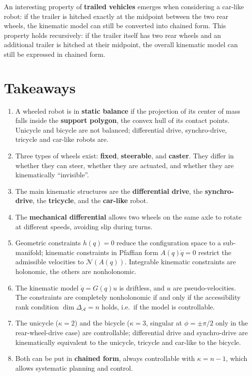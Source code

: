 \begin{nb}
An interesting property of \textbf{trailed vehicles} emerges when
considering a car-like robot: if the trailer is hitched exactly at the
midpoint between the two rear wheels, the kinematic model can still be
converted into chained form. This property holds recursively: if the
trailer itself has two rear wheels and an additional trailer is
hitched at their midpoint, the overall kinematic model can still be
expressed in chained form.
\end{nb}

\section{Takeaways}
\label{sec:wmr-mechanics-takeaways}

\begin{enumerate}
    \item A wheeled robot is in \textbf{static balance} if the
          projection of its center of mass falls inside the
          \textbf{support polygon}, the convex hull of its contact
          points. Unicycle and bicycle are not balanced; differential
          drive, synchro-drive, tricycle and car-like robots are.
    \item Three types of wheels exist: \textbf{fixed}, \textbf{steerable},
          and \textbf{caster}. They differ in whether they can steer,
          whether they are actuated, and whether they are kinematically
          ``invisible''.
    \item The main kinematic structures are the \textbf{differential
          drive}, the \textbf{synchro-drive}, the \textbf{tricycle}, and
          the \textbf{car-like} robot.
    \item The \textbf{mechanical differential} allows two wheels on the
          same axle to rotate at different speeds, avoiding slip during
          turns.
    \item Geometric constraints \( h(q) = 0 \) reduce the configuration
          space to a sub-manifold; kinematic constraints in Pfaffian
          form \( A(q)\dot q = 0 \) restrict the admissible velocities
          to \( \mathcal{N}(A(q)) \). Integrable kinematic constraints
          are holonomic, the others are nonholonomic.
    \item The kinematic model \( \dot q = G(q) u \) is driftless, and
          \( u \) are pseudo-velocities. The constraints are completely
          nonholonomic if and only if the accessibility rank condition
          \( \dim \Delta_{\mathcal{A}} = n \) holds, i.e.\ if the model
          is controllable.
    \item The unicycle (\( \kappa = 2 \)) and the bicycle
          (\( \kappa = 3 \), singular at \( \phi = \pm\pi/2 \) only in
          the rear-wheel-drive case) are controllable; differential
          drive and synchro-drive are kinematically equivalent to the
          unicycle, tricycle and car-like to the bicycle.
    \item Both can be put in \textbf{chained form}, always controllable
          with \( \kappa = n - 1 \), which allows systematic planning
          and control.
\end{enumerate}